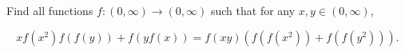 Find all functions 
$f:(0,\infty)\rightarrow (0,\infty)$
 such that for any 
$x,y\in (0,\infty)$, 
 
$$xf(x^2)f(f(y)) + f(yf(x)) = f(xy) \left(f(f(x^2)) + f(f(y^2))\right).$$